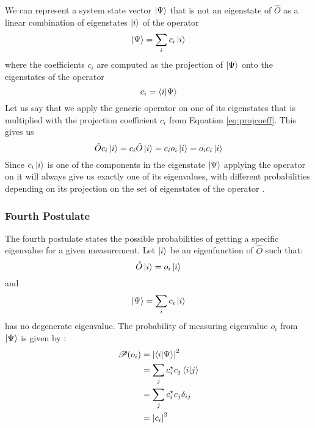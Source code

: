 \documentclass[../master_thesis.tex]{subfiles}
\begin{document}
We can represent a system state vector $\ket{\Psi}$ that is not an eigenstate
of $\hat{O}$ as a linear combination of eigenstates $\ket{i}$ of the operator
\begin{equation}
  \ket{\Psi} = \sum_i c_i \ket{i}
\end{equation}
where the coefficients $c_i$ are computed as the projection of $\ket{\Psi}$ onto
the eigenstates of the operator
\begin{equation}\label{eq:projcoeff}
  c_i = \braket{i|\Psi}
\end{equation}
Let us say that we apply the generic operator on one of its eigenstates that
is multiplied with the projection coefficient $c_i$ from Equation \ref{eq:projcoeff}.
This gives us
\begin{equation}
  \hat{O}c_i\ket{i} = c_i\hat{O}\ket{i} = c_i o_i\ket{i} = o_i c_i\ket{i}
\end{equation}
Since $c_i\ket{i}$ is one of the components in the eigenstate $\ket{\Psi}$
applying the operator on it will always give us exactly one of its eigenvalues, with
different probabilities  depending on its projection on the set of eigenstates
of the operator \cite{Cohen:1973}.

\subsubsection{Fourth Postulate}
The fourth postulate states the possible probabilities of getting a specific
eigenvalue for a given measurement.
Let $\ket{i}$ be an eigenfunction of $\hat{O}$ such that:
\begin{equation}
  \hat{O}\ket{i} = o_i\ket{i}
\end{equation}
and
\begin{equation}
  \ket{\Psi} = \sum_i c_i \ket{i} \label{eq:lincomb}
\end{equation}
has no degenerate eigenvalue.
The probability of measuring eigenvalue  $o_i$ from $\ket{\Psi}$ is given by
\cite{Cohen:1973}:
\begin{align} \label{eq:post4}
  \begin{split}
    \mathscr{P}(o_i) &= \abs{\braket{i|\Psi}}^2\\
                     &= \sum_{j}c_i^\star c_j\braket{i|j}\\
                     &= \sum_{j}c_i^\star c_j\delta_{ij}\\
                     &= \abs{c_i}^2
  \end{split}
\end{align}
\end{document}
